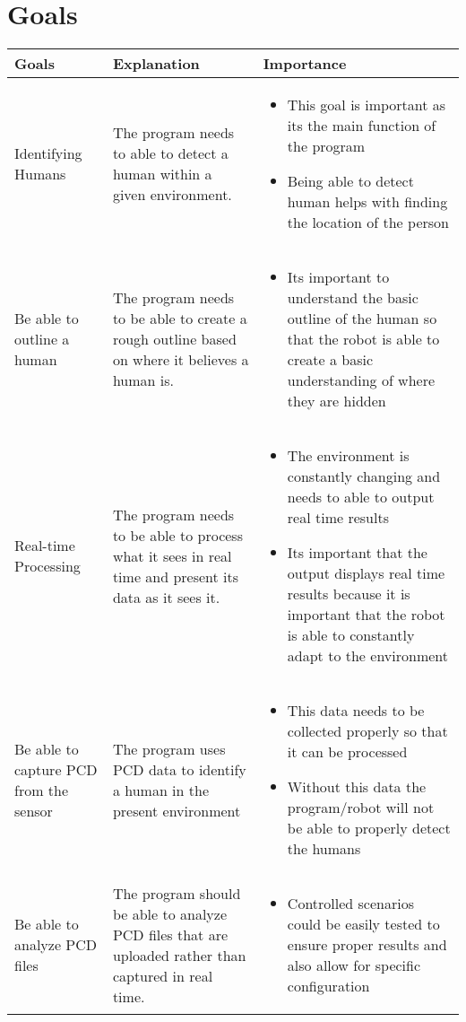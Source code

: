 \documentclass{article}
\begin{document}
\section{Goals}   
        \begin{tabular}{ |p{3cm}|p{3cm}|p{6cm}|  }
        \hline
        Goals & Explanation & Importance \\
        \hline
        Identifying Humans & The program needs to able to detect a human within a given environment.     & 
        \begin{itemize}
        \item This goal is important  as its the main function of the program
        \item Being able to detect human helps with finding the location of the person 
        \end{itemize}\\
        \hline
        Be able to outline a human & The program needs to be able to create a rough outline based on where it believes a human is.    & 
        \begin{itemize}
        \item Its important to understand the basic outline of the human so that the robot is able to create a basic understanding of where they are hidden
        \end{itemize}\\
        \hline
        Real-time Processing & The program needs to be able to process what it sees in real time and present its data as it sees it. & 
        \begin{itemize}
        \item The environment is constantly changing and needs to able to output real time results
        \item Its important that the output displays real time results because it is important that the robot is able to constantly adapt to the environment 
        \end{itemize}\\
        \hline
        Be able to capture  PCD from the sensor   & The program uses PCD data to identify a human in the present environment & 
        \begin{itemize}
        \item This data needs to be collected properly so that it can be processed
        \item Without this data the program/robot will not be able to properly detect the humans
        \end{itemize}\\
        \hline
        Be able to analyze PCD files & The program should be able to analyze PCD files that are uploaded rather than captured in real time. & 
        \begin{itemize}
        \item Controlled scenarios could be easily tested to ensure proper results and also allow for specific configuration
        \end{itemize}\\
        \hline
        \end{tabular}
        
\end{document}
